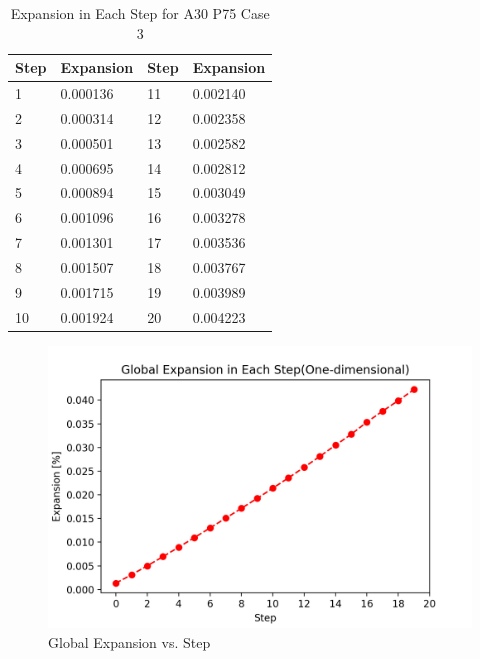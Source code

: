 


  \begin{table}[ht]
  \centering
  \begin{tabular}{ ||p{3cm}|p{3cm}||p{3cm}|p{3cm}|| }
  \hline
   Step &  Expansion & Step & Expansion \\
   \hline\hline
    1 & 0.000136  & 11 & 0.002140 \\
    2 & 0.000314  & 12 & 0.002358 \\
    3 & 0.000501  & 13 & 0.002582 \\
    4 & 0.000695  & 14 & 0.002812 \\
    5 & 0.000894  & 15 & 0.003049 \\
    6 & 0.001096  & 16 & 0.003278 \\
    7 & 0.001301  & 17 & 0.003536 \\
    8 & 0.001507  & 18 & 0.003767 \\
    9 & 0.001715  & 19 & 0.003989 \\
    10 & 0.001924  & 20  & 0.004223 \\
    \hline
    \end{tabular}
  \caption{Expansion in Each Step for A30 P75 Case 3}
  \label{table:A30P75_3_EXP}
  \end{table}

  \begin{figure}[ht!]
  \centering
  \includegraphics[width=.8\linewidth]{Files/exp_plot/ASRA30P75_3_exp.png}
    \caption{Global Expansion vs. Step}
    \label{fig:ASRA30P75_3_exp}
  \end{figure}

